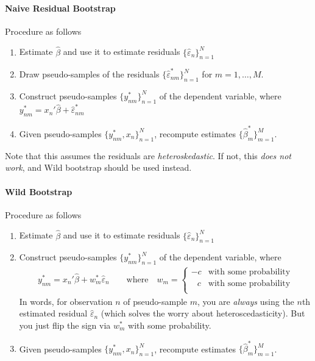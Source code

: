 \documentclass[12pt]{article}
\theoremstyle{plain}
\theoremstyle{definition}
\theoremstyle{remark}
\newcommand{\nN}{_{n=1}^N}
\begin{document}
\paragraph{Naive Residual Bootstrap}
Procedure as follows
\begin{enumerate}
  \item Estimate $\hat{\beta}$ and use it to estimate residuals
    $\{\hat{\varepsilon}_n\}\nN$
  \item Draw pseudo-samples of the residuals
    $\{\hat{\varepsilon}_{nm}^*\}\nN$ for $m=1,\ldots,M$.
  \item Construct pseudo-samples $\{y_{nm}^*\}\nN$ of the dependent
    variable, where $y_{nm}^*=x_n'\hat{\beta}+\hat{\varepsilon}_{nm}^*$
  \item Given pseudo-samples $\{y_{nm}^*,x_n\}\nN$, recompute estimates
    $\{\hat{\beta}_m^*\}_{m=1}^M$.
\end{enumerate}
Note that this assumes the residuals are \emph{heteroskedastic}. If not,
this \emph{does not work}, and Wild bootstrap should be used instead.

\paragraph{Wild Bootstrap}
Procedure as follows
\begin{enumerate}
  \item Estimate $\hat{\beta}$ and use it to estimate residuals
    $\{\hat{\varepsilon}_n\}\nN$
  \item Construct pseudo-samples $\{y_{nm}^*\}\nN$ of the dependent
    variable, where
    \begin{align*}
      y_{nm}^*=x_n'\hat{\beta}+w_m^*\hat{\varepsilon}_{n}
      \qquad\text{where}\quad
      w_m
      =
      \begin{cases}
        -c & \text{with some probability} \\
        \,\;\;c & \text{with some probability} \\
      \end{cases}
    \end{align*}
    In words, for observation $n$ of pseudo-sample $m$, you are
    \emph{always} using the $n$th estimated residual
    $\hat{\varepsilon}_n$ (which solves the worry about
    heteroscedasticity).
    But you just flip the sign via $w_m^*$ with some probability.
  \item Given pseudo-samples $\{y_{nm}^*,x_n\}\nN$, recompute estimates
    $\{\hat{\beta}_m^*\}_{m=1}^M$.
\end{enumerate}
\end{document}
